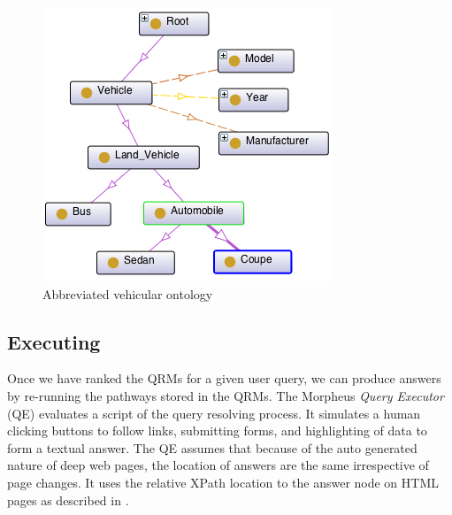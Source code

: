 \begin{figure}[t]
	\centering
	\includegraphics[scale=0.90]{OntologyDiagram.png}
	\caption{Abbreviated vehicular ontology}
	\label{fig:vehicular_ontology}
\end{figure}

\subsection{Executing} 

Once we have ranked the QRMs for a given user query, we can produce answers by re-running the pathways stored in the QRMs. The Morpheus \emph{Query Executor} (QE) evaluates a script of the query resolving process.  It simulates a human clicking buttons to follow links, submitting forms, and highlighting of data to form a textual answer.  The QE assumes that because of the auto generated nature of deep web pages, the location of answers are the same irrespective of page changes.  It uses the relative XPath location to the answer node on HTML pages as described in \cite{Badica06}.



